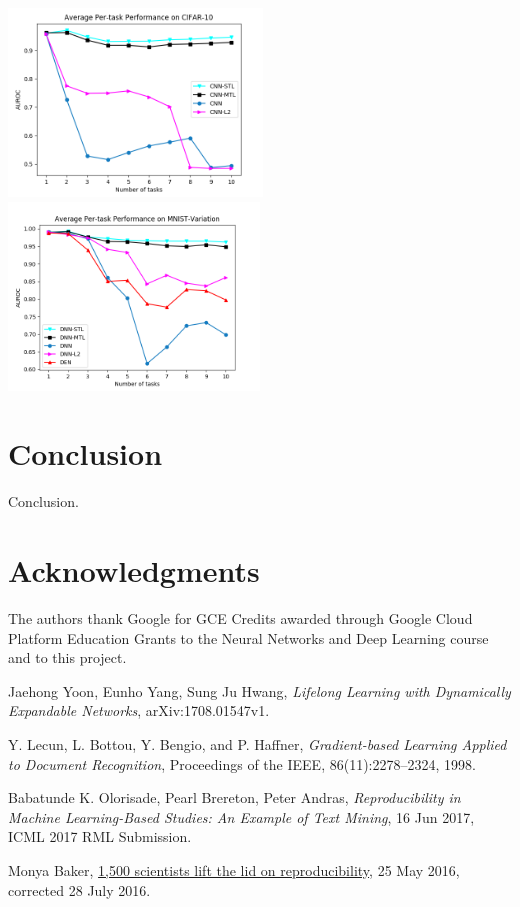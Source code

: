 \documentclass[12pt]{article}
\begin{document}
    \includegraphics[height=5cm]{fig1-s.png}
    \includegraphics[height=5cm]{fig2-v2.png}

    \section {Conclusion}
    
    Conclusion.

    \section{Acknowledgments}

    The authors thank Google for GCE Credits awarded through Google Cloud Platform Education Grants
    to the Neural Networks and Deep Learning course and to this project.    
        
    \begin{thebibliography}{9}
            Jaehong Yoon, Eunho Yang, Sung Ju Hwang,
            \textit{Lifelong Learning with Dynamically Expandable Networks},
            arXiv:1708.01547v1.

            Y. Lecun, L. Bottou, Y. Bengio, and P. Haffner,
            \textit{Gradient-based Learning Applied to Document Recognition},
            Proceedings of the IEEE, 86(11):2278–2324, 1998.

            Babatunde K. Olorisade, Pearl Brereton, Peter Andras, 
            \textit{Reproducibility in Machine Learning-Based Studies: An Example of Text Mining},
            16 Jun 2017, ICML 2017 RML Submission.

            Monya Baker,
            \href{https://www.nature.com/news/1-500-scientists-lift-the-lid-on-reproducibility-1.19970}{1,500 scientists lift the lid on reproducibility},
            25 May 2016, corrected 28 July 2016.

    \end{thebibliography}
    
    
\end{document}
